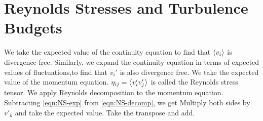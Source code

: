 \section{Reynolds Stresses and Turbulence Budgets}
We take the expected value of the continuity equation to find that $\expval{v_i}$ is divergence free.
Similarly, we expand the continuity equation in terms of expected values of fluctuations,to find that $v_i'$ is also divergence free.
We take the expected value of the momentum equation.
$\eta_{ij}=\expval{v'_iv'_j}$ is called the Reynolds stress tensor. We apply Reynolds decomposition to the momentum equation.
Subtracting \autoref{eqn:NS-exp} from \autoref{eqn:NS-decomp}, we get
Multiply both sides by $v'_k$ and take the expected value.
Take the transpose and add.
